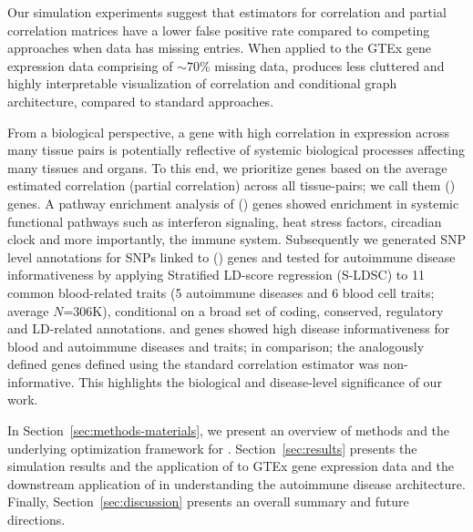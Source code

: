Our simulation experiments suggest that \Robocov{} estimators for correlation and partial correlation matrices have a lower false positive rate compared to competing approaches when data has missing entries.  When applied to the GTEx gene expression data comprising of $\sim70\%$ missing data, \Robocov{} produces less cluttered and highly interpretable visualization of correlation and conditional graph architecture, compared to standard approaches. 

From a biological perspective, a gene with high correlation in expression across many tissue pairs is potentially reflective of systemic biological processes affecting many tissues and organs. To this end, we prioritize genes based on the average \Robocov{} estimated correlation (partial correlation) across all tissue-pairs; we call them  \Robospan{} (\pRobospan{}) genes. A pathway enrichment analysis of  \Robospan{} (\pRobospan{}) genes showed enrichment in systemic functional pathways such as interferon signaling, heat stress factors, circadian clock and more importantly, the immune system. Subsequently we generated SNP level annotations for SNPs linked to \Robospan{} (\pRobospan{}) genes and tested for autoimmune disease informativeness by applying Stratified LD-score regression (S-LDSC) to 11 common blood-related traits (5 autoimmune diseases and 6 blood cell traits; average $N$=306K), conditional on a broad set of coding, conserved, regulatory and LD-related annotations. \Robospan{} and \pRobospan{} genes showed high disease informativeness for blood and autoimmune diseases and traits; in comparison; the analogously defined \Corspan{} genes 
defined using the standard correlation estimator was non-informative. This highlights the biological and disease-level significance of our work.

In Section~\ref{sec:methods-materials}, we present an overview of methods and the underlying optimization framework for \Robocov{}. Section~\ref{sec:results} presents the simulation results and the application of \Robocov{} to GTEx gene expression data and the downstream application of \Robocov{} in understanding the autoimmune disease architecture. Finally, Section~\ref{sec:discussion} presents an overall summary and future directions. 

